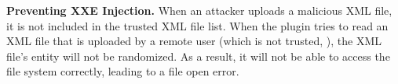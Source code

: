 \noindent
{\bf Preventing XXE Injection.}
When an attacker uploads a malicious XML file, it is not included in the trusted XML file list. 
When the plugin tries to read an XML file that is uploaded by a remote user (which is not trusted, ), the XML file's entity will not be randomized. As a result, it will not be able to access the file system correctly, leading to a file open error.



















%
%
%



